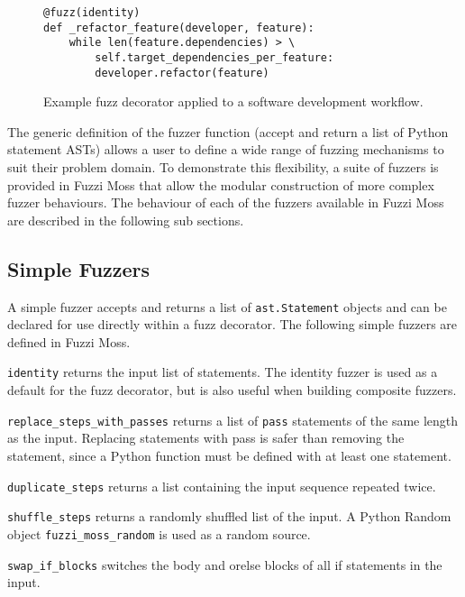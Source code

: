 \documentclass{sig-alternate}
\newenvironment{FunctionList}{%
\lstset{basicstyle=\ttfamily\bfseries\small}
\begin{list}{}{\leftmargin=5pt}
}{\end{list}\lstset{basicstyle=\ttfamily\small}}
\begin{document}
 \begin{figure}
   \centering
  \begin{lstlisting}
@fuzz(identity)
def _refactor_feature(developer, feature):
    while len(feature.dependencies) > \
        self.target_dependencies_per_feature:
        developer.refactor(feature)
  \end{lstlisting}
  
  \caption{Example fuzz decorator applied to a software development workflow.}
  \label{fig:fuzz}
\end{figure}

The generic definition of the fuzzer function (accept and return a list of
Python statement ASTs) allows a user to define a wide range of fuzzing
mechanisms to suit their problem domain.  To demonstrate this flexibility, a
suite of fuzzers is provided in Fuzzi Moss that allow the modular construction
of more complex fuzzer behaviours.  The behaviour of each of the fuzzers
available in Fuzzi Moss are described in the following sub sections.


\subsection{Simple Fuzzers}


A simple fuzzer accepts and returns a list of \lstinline!ast.Statement! objects
and can be declared for use directly within a fuzz decorator.  The following
simple fuzzers are defined in Fuzzi Moss.

\begin{FunctionList}

\item\lstinline!identity! returns the input list of statements.  The identity
  fuzzer is used as a default for the fuzz decorator, but is also useful when
  building composite fuzzers.

\item\lstinline!replace_steps_with_passes! returns a list of \lstinline!pass!
  statements of the same length as the input.  Replacing statements with pass is
  safer than removing the statement, since a Python function must be defined
  with at least one statement.

\item\lstinline!duplicate_steps! returns a list containing the input sequence
  repeated twice.

\item\lstinline!shuffle_steps! returns a randomly shuffled list of the input.  A
  Python Random object \lstinline!fuzzi_moss_random! is used as a random source.

\item \lstinline!swap_if_blocks! switches the body and orelse blocks of all if
  statements in the input.

\end{FunctionList}
\end{document}
